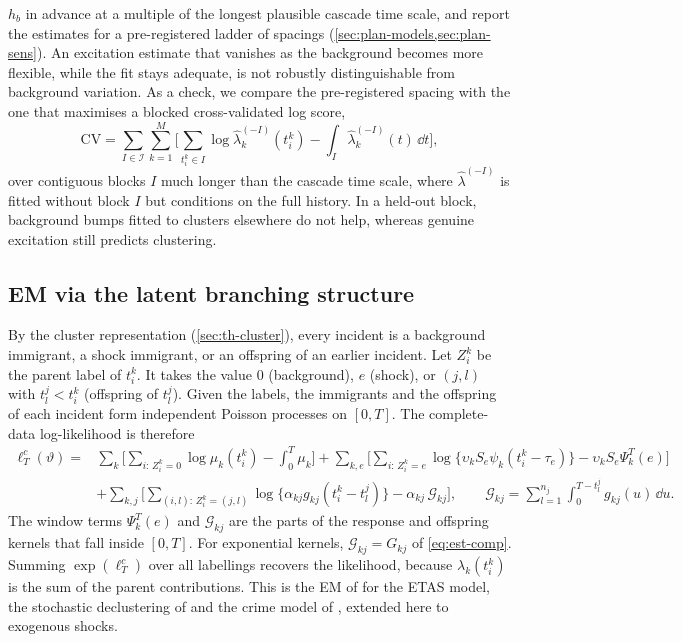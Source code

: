 $h_b$ in advance at a multiple of the longest plausible cascade time scale, and report the
estimates for a pre-registered ladder of spacings (\cref{sec:plan-models,sec:plan-sens}). An
excitation estimate that vanishes as the background becomes more flexible, while the fit
stays adequate, is not robustly distinguishable from background variation. As a check, we
compare the pre-registered spacing with the one that maximises a blocked cross-validated log
score,
\begin{equation}\label{eq:est-cv}
  \mathrm{CV}=\sum_{I\in\mathcal I}\sum_{k=1}^{M}\Big[\sum_{t^k_i\in I}
  \log\hat\lambda^{(-I)}_k(t^k_i)-\int_{I}\hat\lambda^{(-I)}_k(t)\,\dd t\Big],
\end{equation}
over contiguous blocks $I$ much longer than the cascade time scale, where
$\hat\lambda^{(-I)}$ is fitted without block $I$ but conditions on the full history. In a
held-out block, background bumps fitted to clusters elsewhere do not help, whereas genuine
excitation still predicts clustering.

\subsection{EM via the latent branching structure}\label{sec:est-em}

By the cluster representation (\cref{sec:th-cluster}), every incident is a background
immigrant, a shock immigrant, or an offspring of an earlier incident. Let $Z^k_i$ be the
parent label of $t^k_i$. It takes the value $0$ (background), $e$ (shock), or $(j,l)$ with
$t^j_l<t^k_i$ (offspring of $t^j_l$). Given the labels, the immigrants and the offspring
of each incident form independent Poisson processes on $[0,T]$. The complete-data
log-likelihood is therefore
\begin{equation}\label{eq:est-complete}
\begin{aligned}
  \ell^{c}_T(\vartheta)={}&\sum_k\Big[\sum_{i:\,Z^k_i=0}\log\mu_k(t^k_i)-\int_0^T\mu_k\Big]
  +\sum_{k,e}\Big[\sum_{i:\,Z^k_i=e}\log\{\upsilon_kS_e\psi_k(t^k_i-\tau_e)\}-\upsilon_kS_e\Psi^T_k(e)\Big]\\
  &+\sum_{k,j}\Big[\sum_{(i,l):\,Z^k_i=(j,l)}\log\{\alpha_{kj}g_{kj}(t^k_i-t^j_l)\}
  -\alpha_{kj}\,\mathcal G_{kj}\Big],
  \qquad \mathcal G_{kj}=\sum_{l=1}^{n_j}\int_0^{T-t^j_l}g_{kj}(u)\,\dd u .
\end{aligned}
\end{equation}
The window terms $\Psi^T_k(e)$ and $\mathcal G_{kj}$ are the parts of the response and
offspring kernels that fall inside $[0,T]$. For exponential kernels, $\mathcal G_{kj}=G_{kj}$
of \eqref{eq:est-comp}. Summing $\exp(\ell^c_T)$ over all labellings recovers the
likelihood, because $\lambda_k(t^k_i)$ is the sum of the parent contributions. This is the
EM of \citet{veen2008} for the ETAS model, the stochastic declustering of
\citet{marsan2008} and the crime model of \citet{mohler2011}, extended here to exogenous
shocks.

